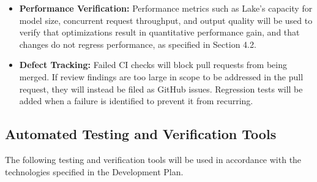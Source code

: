 \documentclass[12pt, titlepage]{article}
\begin{document}
\begin{itemize}
  \item \textbf{Performance Verification:}
  Performance metrics such as Lake's capacity for model size, concurrent request throughput, and output quality will be used to verify that optimizations result in quantitative performance gain, and that changes do not regress performance, as specified in Section 4.2.

  \item \textbf{Defect Tracking:}
  Failed CI checks will block pull requests from being merged. If review findings are too large in scope to be addressed in the pull request, they will instead be filed as GitHub issues. Regression tests will be added when a failure is identified to prevent it from recurring.
\end{itemize}

\subsection{Automated Testing and Verification Tools}
\label{sec:AutoTestVer}
The following testing and verification tools will be used in accordance with the technologies specified in the Development Plan.
\end{document}
